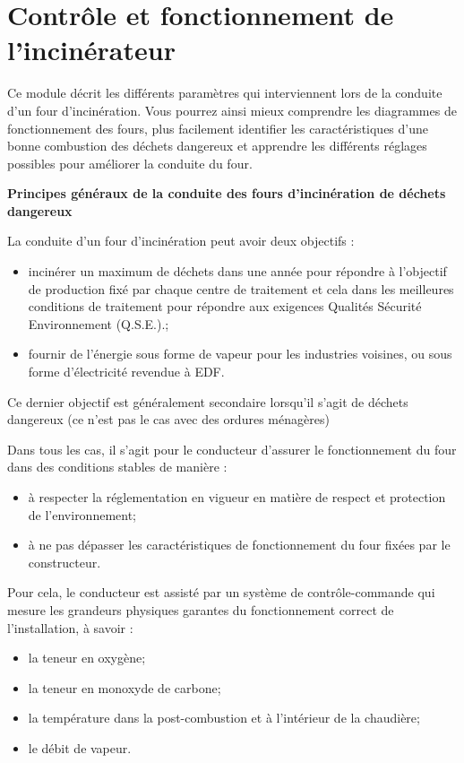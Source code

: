 
\chapter{Contrôle et fonctionnement de l'incinérateur}

Ce module décrit les différents paramètres qui interviennent lors de la conduite d’un four d’incinération. Vous pourrez ainsi mieux comprendre les diagrammes de fonctionnement des fours, plus facilement identifier les caractéristiques d’une bonne combustion des déchets dangereux et apprendre les différents réglages possibles pour améliorer la conduite du four.

\vspace{0.3cm}

\textbf{Principes généraux de la conduite des fours d’incinération de déchets dangereux}

\vspace{0.3cm} 
La conduite d’un four d’incinération peut avoir deux objectifs :
\begin{itemize}
\item  incinérer un maximum de déchets dans une année pour répondre à l’objectif de production fixé par chaque centre de traitement et cela dans les meilleures conditions de traitement pour répondre aux exigences Qualités Sécurité Environnement (Q.S.E.).;
\item  fournir de l’énergie sous forme de vapeur pour les industries voisines, ou sous forme d’électricité revendue à EDF.

\end{itemize}

Ce dernier objectif est généralement secondaire lorsqu’il s’agit de déchets dangereux (ce n’est pas le cas avec des ordures ménagères)

Dans tous les cas, il s’agit pour le conducteur d’assurer le fonctionnement du four dans des conditions stables de manière :

\begin{itemize}
\item  à respecter la réglementation en vigueur en matière de respect et protection de l’environnement;
\item  à ne pas dépasser les caractéristiques de fonctionnement du four fixées par le constructeur.

\end{itemize}


Pour cela, le conducteur est assisté par un système de contrôle-commande qui mesure les grandeurs physiques garantes du fonctionnement correct de l’installation, à savoir :
\begin{itemize}
\item  la teneur en oxygène;
\item  la teneur en monoxyde de carbone;
\item  la température dans la post-combustion et à l’intérieur de la chaudière;
\item  le débit de vapeur.
\end{itemize}




